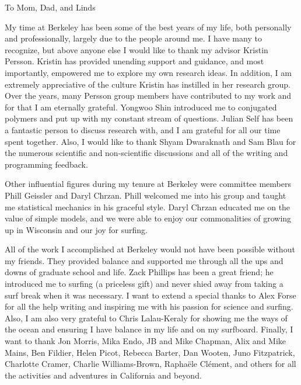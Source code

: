 \documentclass{ucbthesis}
\begin{document}
\begin{frontmatter}

\begin{dedication}
\null\vfil
\begin{center}
To Mom, Dad, and Linds\\\vspace{12pt}
\end{center}
\vfil\null
\end{dedication}


\tableofcontents
\clearpage
\listoffigures
\clearpage
\listoftables

\begin{acknowledgements}
  My time at Berkeley has been some of the best years of my life, both personally and professionally, largely due to the people around me. I have many to recognize, but above anyone else I would like to thank my advisor Kristin Persson. Kristin has provided unending support and guidance, and most importantly, empowered me to explore my own research ideas. In addition, I am extremely appreciative of the culture Kristin has instilled in her research group. Over the years, many Persson group members have contributed to my work and for that I am eternally grateful. Yongwoo Shin introduced me to conjugated polymers and put up with my constant stream of questions. Julian Self has been a fantastic person to discuss research with, and I am grateful for all our time spent together. Also, I would like to thank Shyam Dwaraknath and Sam Blau for the numerous scientific and non-scientific discussions and all of the writing and programming feedback.

  Other influential figures during my tenure at Berkeley were committee members Phill Geissler and Daryl Chrzan. Phill welcomed me into his group and taught me statistical mechanics in his graceful style. Daryl Chrzan educated me on the value of simple models, and we were able to enjoy our commonalities of growing up in Wisconsin and our joy for surfing.

  All of the work I accomplished at Berkeley would not have been possible without my friends. They provided balance and supported me through all the ups and downs of graduate school and life. Zack Phillips has been a great friend; he introduced me to surfing (a priceless gift) and never shied away from taking a surf break when it was necessary. I want to extend a special thanks to Alex Forse for all the help writing and inspiring me with his passion for science and surfing. Also, I am also very grateful to Chris Lalau-Keraly for showing me the ways of the ocean and ensuring I have balance in my life and on my surfboard. Finally, I want to thank Jon Morris, Mika Endo, JB and Mike Chapman, Alix and Mike Mains, Ben Fildier, Helen Picot, Rebecca Barter, Dan Wooten, Juno Fitzpatrick, Charlotte Cramer, Charlie Williams-Brown, Raphaële Clément, and others for all the activities and adventures in California and beyond.


\end{acknowledgements}
\end{frontmatter}
\end{document}
